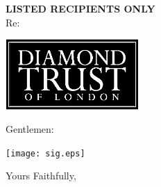 \documentclass[12pt]{letter}
\begin{document}
\begin{letter}{{\bf LISTED RECIPIENTS ONLY}\\ \vspace{0.25in} Re: \protect}

\vspace*{-1.0in}
\begin{center}
\includegraphics[width=2in]{../logo_withFonts.eps}
\end{center}

\vspace*{-1.25in}

\address{
14 Greville St\\
Suite 77\\
London\\
EC1N 8BQ\\
UK\\
\\
+44 (0)20 7327 3080}

\date{May 2, 2000}

\signature{Jason Rohrer\\Acting President\\Diamond Trust of London}


\opening{Gentlemen:}




\vspace*{0.35in}
\begin{center}
\texttt{[image: sig.eps]}
\end{center}
\vspace*{-1.25in}


\closing{Yours Faithfully,}





\end{letter}
\end{document}
